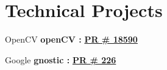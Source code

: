 \documentclass[letterpaper]{deedy-resume} %
\begin{document}
\begin{minipage}[t]{0.66\textwidth}
\section{Technical Projects}

\vspace{0.2cm}
\begin{tightitemize}
\item OpenCV {\bf openCV :} \hspace{0.1cm} \href{https://github.com/opencv/opencv/pull/18590}{\textbf{PR \# 18590}}
\item Google {\bf gnostic :} \hspace{0.1cm} \href{https://github.com/google/gnostic/pull/226}{\textbf{PR \# 226}}
\end{tightitemize}

\end{minipage}
\end{document}
